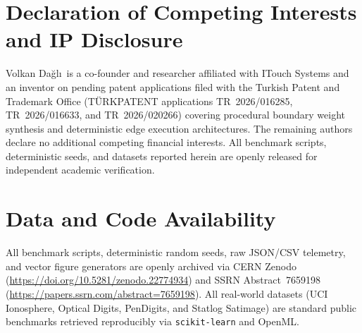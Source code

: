 \section*{Declaration of Competing Interests and IP Disclosure}
Volkan Da\u{g}l\i\ is a co-founder and researcher affiliated with ITouch Systems and an inventor on pending patent applications filed with the Turkish Patent and Trademark Office (T\"{U}RKPATENT applications TR~2026/016285, TR~2026/016633, and TR~2026/020266) covering procedural boundary weight synthesis and deterministic edge execution architectures. The remaining authors declare no additional competing financial interests. All benchmark scripts, deterministic seeds, and datasets reported herein are openly released for independent academic verification.

\section*{Data and Code Availability}
All benchmark scripts, deterministic random seeds, raw JSON/CSV telemetry, and vector figure generators are openly archived via CERN Zenodo (\url{https://doi.org/10.5281/zenodo.22774934}) and SSRN Abstract~7659198 (\url{https://papers.ssrn.com/abstract=7659198}). All real-world datasets (UCI Ionosphere, Optical Digits, PenDigits, and Statlog Satimage) are standard public benchmarks retrieved reproducibly via \texttt{scikit-learn} and OpenML.
